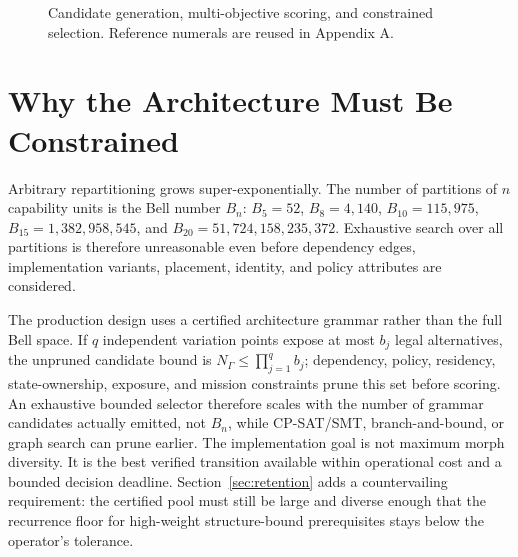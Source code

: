 \documentclass[11pt,letterpaper]{article}
\begin{document}
\begin{figure}[t]
\caption{Candidate generation, multi-objective scoring, and constrained selection. Reference numerals are reused in Appendix A.}
\label{fig:select}
\end{figure}

\section{Why the Architecture Must Be Constrained}

Arbitrary repartitioning grows super-exponentially. The number of partitions of $n$ capability units is the Bell number $B_n$: $B_5=52$, $B_8=4{,}140$, $B_{10}=115{,}975$, $B_{15}=1{,}382{,}958{,}545$, and $B_{20}=51{,}724{,}158{,}235{,}372$. Exhaustive search over all partitions is therefore unreasonable even before dependency edges, implementation variants, placement, identity, and policy attributes are considered.

The production design uses a certified architecture grammar rather than the full Bell space. If $q$ independent variation points expose at most $b_j$ legal alternatives, the unpruned candidate bound is $N_\Gamma\le\prod_{j=1}^{q}b_j$; dependency, policy, residency, state-ownership, exposure, and mission constraints prune this set before scoring. An exhaustive bounded selector therefore scales with the number of grammar candidates actually emitted, not $B_n$, while CP-SAT/SMT, branch-and-bound, or graph search can prune earlier. The implementation goal is not maximum morph diversity. It is the best verified transition available within operational cost and a bounded decision deadline. Section~\ref{sec:retention} adds a countervailing requirement: the certified pool must still be large and diverse enough that the recurrence floor for high-weight structure-bound prerequisites stays below the operator's tolerance.
\end{document}
